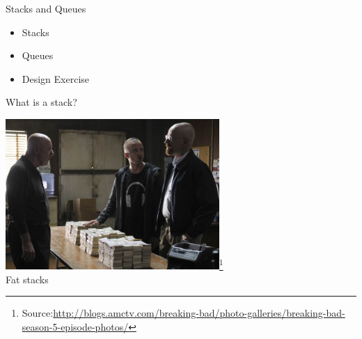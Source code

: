 \documentclass{beamer}
\begin{document}
\begin{frame}
  \titlepage
\end{frame}

\begin{frame}[fragile]{Stacks and Queues}

\begin{itemize}
\item Stacks
\item Queues
\item Design Exercise
\end{itemize}


\end{frame}

\begin{frame}[fragile]{What is a stack?}


\begin{center}
\includegraphics[height=2.25in]{episode-3-mike-jesse-walt.jpg}\footnote{Source:\url{http://blogs.amctv.com/breaking-bad/photo-galleries/breaking-bad-season-5-episode-photos/}}\\
Fat stacks
\end{center}

\end{frame}
\end{document}
